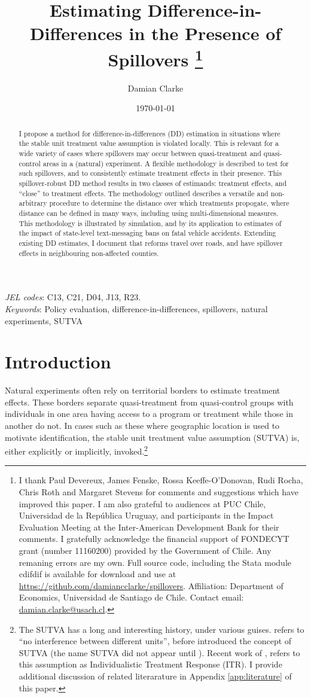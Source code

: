 \documentclass[12pt]{article}
\title{Estimating Difference-in-Differences in the Presence of Spillovers%
  \thanks{I thank Paul Devereux, James Fenske, Rossa Keeffe-O'Donovan, Rudi Rocha,
    Chris Roth and Margaret
    Stevens for comments and suggestions which have improved this paper. I am also
    grateful to audiences at PUC Chile, Universidad de la Rep\'ublica Uruguay, and
    participants in the Impact Evaluation Meeting at the Inter-American Development
    Bank for their comments. I gratefully acknowledge the financial support of
    FONDECYT grant (number 11160200) provided by the Government of Chile.  Any
    remaning errors are my own. Full source code, including the Stata module cdifdif
    is available for download and use at 
\href{https://github.com/damiancclarke/spillovers}{https://github.com/damiancclarke/spillovers}.  
Affiliation: Department of Economics, Universidad de Santiago de Chile. Contact email:
\href{mailto:damian.clarke@usach.cl}{damian.clarke@usach.cl}.}}
\author{Damian Clarke}
\date{\today}
\begin{document}
\maketitle
\begin{spacing}{1.3}
\begin{abstract}
  I propose a method for difference-in-differences (DD) estimation in
  situations where the stable unit treatment value assumption is violated
  locally. This is relevant for a wide variety of cases where spillovers may
  occur between quasi-treatment and quasi-control areas in a (natural)
  experiment. A flexible methodology is described to test for such spillovers,
  and to consistently estimate treatment effects in their presence. This
  spillover-robust DD method results in two classes of estimands: treatment
  effects, and ``close'' to treatment effects. The methodology outlined
  describes a versatile and non-arbitrary procedure to determine the distance
  over which treatments propogate, where distance can be defined in many ways,
  including using multi-dimensional measures. This methodology is illustrated
  by simulation, and by its application to estimates of the impact of
  state-level text-messaging bans on fatal vehicle accidents.  Extending
  existing DD estimates, I document that reforms travel over roads, and have
  spillover effects in neighbouring non-affected counties.
\end{abstract}
\noindent\emph{JEL codes}: C13, C21, D04, J13, R23. \\
\noindent\emph{Keywords}: Policy evaluation, difference-in-differences,
spillovers, natural experiments, SUTVA
\newpage
\section{Introduction}
Natural experiments often rely on territorial borders to estimate treatment 
effects.  These borders separate quasi-treatment from quasi-control groups with
individuals in one area having access to a program or treatment while those in 
another do not.  In cases such as these where geographic location is used to 
motivate identification, the stable unit treatment value assumption (SUTVA) is, 
either explicitly or implicitly, invoked.\footnote{The SUTVA has a long and 
interesting history, under various guises. \citet{Cox1958} refers to ``no 
interference between different units'', before \citet{Rubin1978} introduced the 
concept of SUTVA (the name SUTVA did not appear until \citet{Rubin1980}).  
Recent work of \citet{Manski2013}, refers to this assumption as Individualistic 
Treatment Response (ITR). I provide additional discussion of related
literarature in Appendix \ref{app:literature} of this paper.}


\end{spacing}
\end{document}
